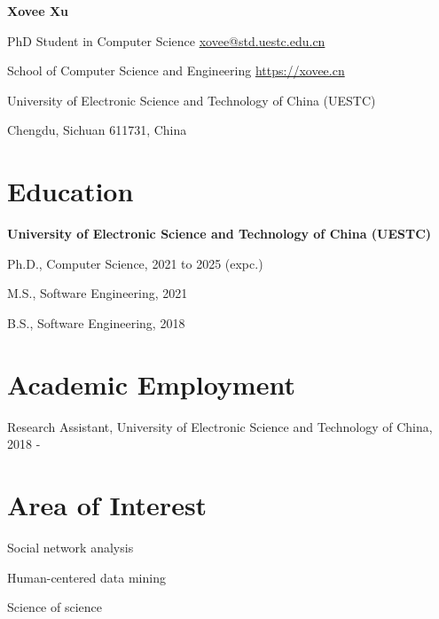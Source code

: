 \documentclass{article}
\begin{document}
\begin{center}
    \vspace*{10pt}
    \Huge{
    \textbf{Xovee Xu}}
\end{center}
\vspace{15pt}

\setlength{\parskip}{1pt}

\noindent PhD Student in Computer Science \hfill \href{mailto:xovee@std.uestc.edu.cn}{xovee@std.uestc.edu.cn}

\noindent School of Computer Science and Engineering \hfill \url{https://xovee.cn}

\noindent University of Electronic Science and Technology of China (UESTC)

\noindent Chengdu, Sichuan 611731, China


\setlength{\parskip}{3pt}

\section*{Education}
\indent 

\textbf{University of Electronic Science and Technology of China (UESTC)}

\hspace{2em}Ph.D., Computer Science, 2021 to 2025 (expc.)

\hspace{2em}M.S., Software Engineering, 2021

\hspace{2em}B.S., Software Engineering, 2018

\section*{Academic Employment}
\indent

Research Assistant, University of Electronic Science and Technology of China, 2018 -



\section*{Area of Interest}
\indent

Social network analysis

Human-centered data mining

Science of science


\end{document}
